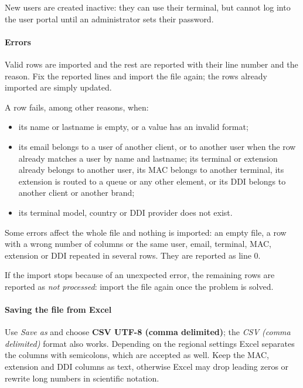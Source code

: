 \documentclass[letterpaper,10pt,english]{sphinxmanual}
\begin{document}
New users are created inactive: they can use their terminal, but cannot log into
the user portal until an administrator sets their password.


\paragraph{Errors}
\label{administration_portal/brand/clients/virtual_pbx:errors}
Valid rows are imported and the rest are reported with their line number and the
reason. Fix the reported lines and import the file again; the rows already imported
are simply updated.

A row fails, among other reasons, when:
\begin{itemize}
\item {} 
its name or lastname is empty, or a value has an invalid format;

\item {} 
its email belongs to a user of another client, or to another user when the
row already matches a user by name and lastname; its terminal or extension
already belongs to another user, its MAC belongs to another terminal, its
extension is routed to a queue or any other element, or its DDI belongs to
another client or another brand;

\item {} 
its terminal model, country or DDI provider does not exist.

\end{itemize}

Some errors affect the whole file and nothing is imported: an empty file, a row
with a wrong number of columns or the same user, email, terminal, MAC, extension
or DDI repeated in several rows. They are reported as line 0.

If the import stops because of an unexpected error, the remaining rows are
reported as \emph{not processed}: import the file again once the problem is solved.


\paragraph{Saving the file from Excel}
\label{administration_portal/brand/clients/virtual_pbx:saving-the-file-from-excel}
Use \emph{Save as} and choose \textbf{CSV UTF-8 (comma delimited)}; the \emph{CSV (comma delimited)}
format also works. Depending on the regional settings Excel separates the columns
with semicolons, which are accepted as well. Keep the MAC, extension and DDI
columns as text, otherwise Excel may drop leading zeros or rewrite long numbers
in scientific notation.
\end{document}
